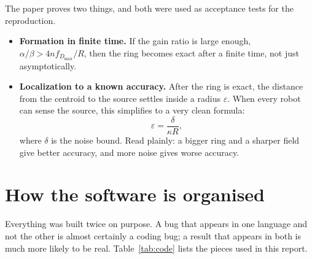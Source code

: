 \documentclass[11pt,a4paper]{article}
\begin{document}
The paper proves two things, and both were used as acceptance tests for the reproduction.

\begin{itemize}
    \item \textbf{Formation in finite time.} If the gain ratio is large enough,
    $\alpha/\beta > 4 n f_{D_{\max}} / R$, then the ring becomes exact after a finite time, not just
    asymptotically.
    \item \textbf{Localization to a known accuracy.} After the ring is exact, the distance from the
    centroid to the source settles inside a radius $\varepsilon$. When every robot can sense the
    source, this simplifies to a very clean formula:
    \begin{equation}\label{eq:epsilon}
        \varepsilon = \frac{\delta}{\kappa R},
    \end{equation}
    where $\delta$ is the noise bound. Read plainly: a bigger ring and a sharper field give better
    accuracy, and more noise gives worse accuracy.
\end{itemize}

\section{How the software is organised}

Everything was built twice on purpose. A bug that appears in one language and not the other is
almost certainly a coding bug; a result that appears in both is much more likely to be real.
Table~\ref{tab:code} lists the pieces used in this report.
\end{document}

